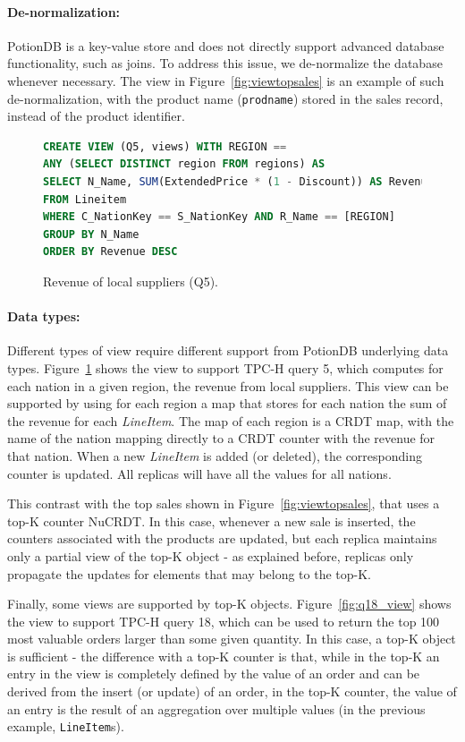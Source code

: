 \documentclass[sigplan,review,anonymous]{acmart}
\begin{document}
\paragraph{De-normalization:} PotionDB is a key-value store and does not directly support advanced database functionality,
such as joins.  To address this issue, we de-normalize the database whenever necessary.  
The view in Figure~\ref{fig:viewtopsales} is an example of such de-normalization, with
the product name (\texttt{prodname}) stored in the sales record, instead of the product identifier.

\begin{figure}[t]
\small{
\begin{lstlisting}[language=SQL]
CREATE VIEW (Q5, views) WITH REGION == 
ANY (SELECT DISTINCT region FROM regions) AS
SELECT N_Name, SUM(ExtendedPrice * (1 - Discount)) AS Revenue
FROM Lineitem
WHERE C_NationKey == S_NationKey AND R_Name == [REGION]
GROUP BY N_Name
ORDER BY Revenue DESC
\end{lstlisting}}
	\caption{Revenue of local suppliers (Q5).}
	\label{fig:viewlocalsupliers}
\end{figure}


\paragraph{Data types:} Different types of view require different support from PotionDB underlying data types.
Figure~\ref{fig:viewlocalsupliers} shows the view to support TPC-H query 5, which computes
for each nation in a given region, the revenue from local suppliers. 
This view can be supported by using for each region a map that stores for each nation the sum of the 
revenue for each \emph{LineItem}. The map of each region is a CRDT map, with the name of the nation mapping
directly to a CRDT counter with the revenue for that nation. When a new \emph{LineItem} is added (or deleted), 
the corresponding counter is updated. All replicas will have all the values for all nations.

This contrast with the top sales shown in Figure~\ref{fig:viewtopsales}, that uses a
top-K counter NuCRDT. In this case, whenever a new sale is inserted, the counters associated with the products are
updated, but each replica maintains only a partial view of the top-K object - as explained before, replicas only propagate 
the updates for elements that may belong to the top-K.

Finally,  some views are supported by top-K objects. Figure~\ref{fig:q18_view} shows the view to 
support TPC-H query 18, which can be used to return the top 100 most valuable orders larger than 
some given quantity.  In this case, a top-K object is sufficient - the difference with a top-K counter is that,
while in the top-K an entry in the view is completely defined by the value of an order and can be derived 
from the insert (or update) of an order, in the top-K counter, the value of an entry is the result of an 
aggregation over multiple values (in the previous example, \texttt{LineItem}s).
\end{document}
